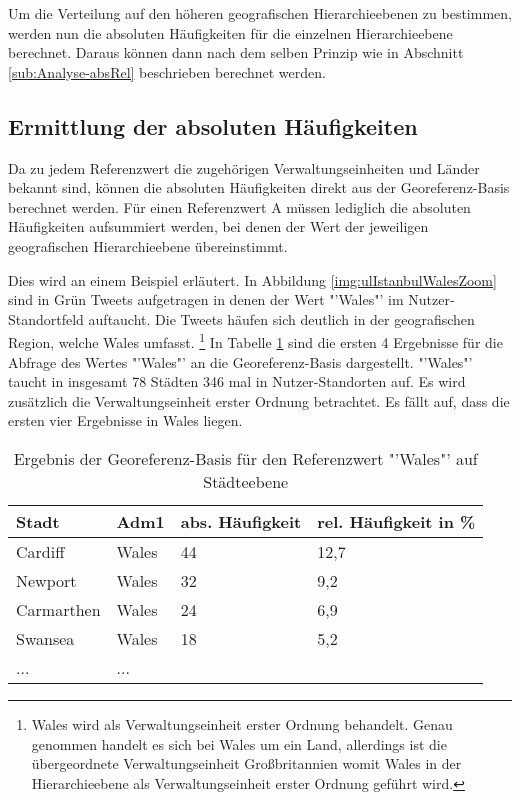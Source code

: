 			Um die Verteilung auf den höheren geografischen Hierarchieebenen zu bestimmen, werden nun die absoluten Häufigkeiten für die einzelnen Hierarchieebene berechnet.
			Daraus können dann nach dem selben Prinzip wie in Abschnitt \ref{sub:Analyse-absRel} beschrieben berechnet werden.
			
			

		\subsection{Ermittlung der absoluten Häufigkeiten} 

			Da zu jedem Referenzwert die zugehörigen Verwaltungseinheiten und Länder bekannt sind, können die absoluten Häufigkeiten direkt aus der Georeferenz-Basis berechnet werden.
			Für einen Referenzwert A müssen lediglich die absoluten Häufigkeiten aufsummiert werden, bei denen der Wert der jeweiligen geografischen Hierarchieebene übereinstimmt.

			Dies wird an einem Beispiel erläutert.
			In Abbildung \ref{img:ulIstanbulWalesZoom} sind in Grün Tweets aufgetragen in denen der Wert "'Wales"' im Nutzer-Standortfeld auftaucht.
			Die Tweets häufen sich deutlich in der geografischen Region, welche Wales umfasst. \footnote{Wales wird als Verwaltungseinheit erster Ordnung behandelt. Genau genommen handelt es sich bei Wales um ein Land, allerdings ist die übergeordnete Verwaltungseinheit Großbritannien womit Wales in der Hierarchieebene als Verwaltungseinheit erster Ordnung geführt wird.} 
			In Tabelle \ref{tab:walesCity} sind die ersten 4 Ergebnisse für die Abfrage des Wertes "'Wales"' an die Georeferenz-Basis dargestellt.
			"'Wales"' taucht in insgesamt 78 Städten 346 mal in Nutzer-Standorten auf.
			Es wird zusätzlich die Verwaltungseinheit erster Ordnung betrachtet.
			Es fällt auf, dass die ersten vier Ergebnisse in Wales liegen.

			\begin{table}[h]
			\centering
			\caption{Ergebnis der Georeferenz-Basis für den Referenzwert "'Wales"' auf Städteebene}
			\label{tab:walesCity}
			\begin{tabular}{|l|l|l|l|}
			\hline
			Stadt      & Adm1 & abs. Häufigkeit & rel. Häufigkeit in \% \\ \hline \hline
			Cardiff    & Wales & 44 			& 12,7 \\ \hline
			Newport    & Wales & 32 			& 9,2  \\ \hline
			Carmarthen & Wales & 24 			& 6,9  \\ \hline
			Swansea    & Wales & 18 			& 5,2  \\ \hline
			...    & ... \\ \hline
			\end{tabular}
			\end{table}

